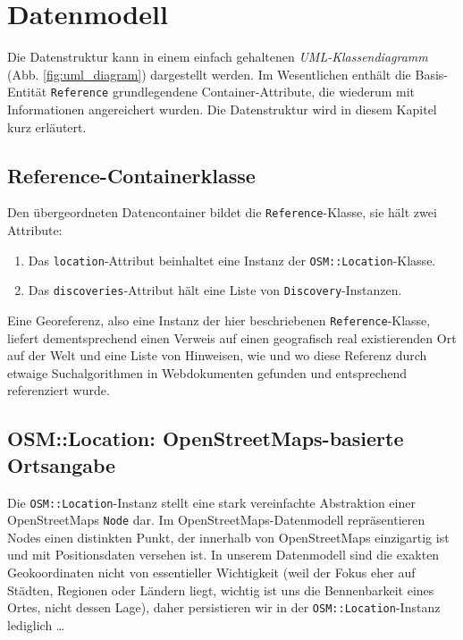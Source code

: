 \section{Datenmodell}
\label{datenmodell}

Die Datenstruktur kann in einem einfach gehaltenen \textit{UML-Klassendiagramm} (Abb. \ref{fig:uml_diagram}) dargestellt werden. Im Wesentlichen enthält die Basis-Entität \texttt{Reference}  grundlegendene Container-Attribute, die wiederum mit Informationen angereichert wurden. Die Datenstruktur wird in diesem Kapitel kurz erläutert.



\subsection{Reference-Containerklasse}
Den übergeordneten Datencontainer bildet die \texttt{Reference}-Klasse, sie hält zwei Attribute:

\begin{enumerate}
   \item Das \texttt{location}-Attribut beinhaltet eine Instanz der \texttt{OSM::Location}-Klasse. 
   \item Das \texttt{discoveries}-Attribut hält eine Liste von \texttt{Discovery}-Instanzen. 
\end{enumerate}

Eine Georeferenz, also eine Instanz der hier beschriebenen \texttt{Reference}-Klasse, liefert dementsprechend einen Verweis auf einen geografisch real existierenden Ort auf der Welt und eine Liste von Hinweisen, wie und wo diese Referenz durch etwaige Suchalgorithmen in Webdokumenten gefunden und entsprechend referenziert wurde.

\subsection{OSM::Location: OpenStreetMaps-basierte Ortsangabe}
Die \texttt{OSM::Location}-Instanz stellt eine stark vereinfachte Abstraktion einer OpenStreetMaps \texttt{Node}\cite{OSMnode} dar. Im OpenStreetMaps-Datenmodell repräsentieren Nodes einen distinkten Punkt, der innerhalb von OpenStreetMaps einzigartig ist und mit Positionsdaten versehen ist. In unserem Datenmodell sind die exakten Geokoordinaten nicht von essentieller Wichtigkeit (weil der Fokus eher auf Städten, Regionen oder Ländern liegt, wichtig ist uns die Bennenbarkeit eines Ortes, nicht dessen Lage), daher persistieren wir in der \texttt{OSM::Location}-Instanz lediglich \ldots

